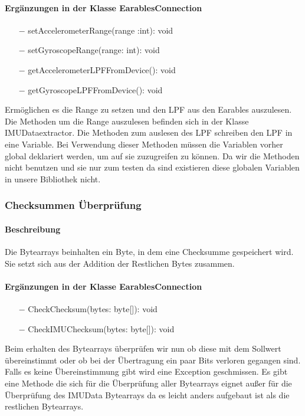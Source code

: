 \documentclass[a4paper,12pt]{article}
\begin{document}
\paragraph{Ergänzungen in der Klasse EarablesConnection}
\begin{itemize}
	\item[$-$] setAccelerometerRange(range :int): void
	\item[$-$] setGyroscopeRange(range: int): void
	\item[$-$ ] getAccelerometerLPFFromDevice(): void
	\item[$-$ ] getGyroscopeLPFFromDevice(): void
\end{itemize}
Ermöglichen es die Range zu setzen und den LPF aus den Earables auszulesen. Die Methoden um die Range auszulesen befinden sich in der Klasse IMUDataextractor. Die Methoden zum auslesen des  LPF schreiben den LPF in eine Variable. Bei Verwendung dieser Methoden müssen die Variablen vorher global deklariert werden, um auf sie zuzugreifen zu können. Da wir die Methoden nicht benutzen und sie nur zum testen da sind existieren diese globalen Variablen in unsere Bibliothek nicht.

\subsubsection{Checksummen Überprüfung}
\paragraph{Beschreibung}
Die Bytearrays beinhalten ein Byte, in dem eine Checksumme gespeichert wird. Sie setzt sich aus der Addition der Restlichen Bytes zusammen. 

\paragraph{Ergänzungen in der Klasse EarablesConnection}
\begin{itemize}
	\item[$-$] CheckChecksum(bytes: byte[]): void
	\item[$-$] CheckIMUChecksum(bytes: byte[]): void
\end{itemize}
Beim erhalten des Bytearrays überprüfen wir nun ob diese mit dem Sollwert übereinstimmt oder ob bei der Übertragung ein paar Bits verloren gegangen sind. Falls es keine Übereinstimmung gibt wird eine Exception geschmissen. Es gibt eine Methode die sich für die Überprüfung aller Bytearrays eignet außer für die Überprüfung des IMUData Bytearrays da es leicht anders aufgebaut ist als die restlichen Bytearrays.
\end{document}
